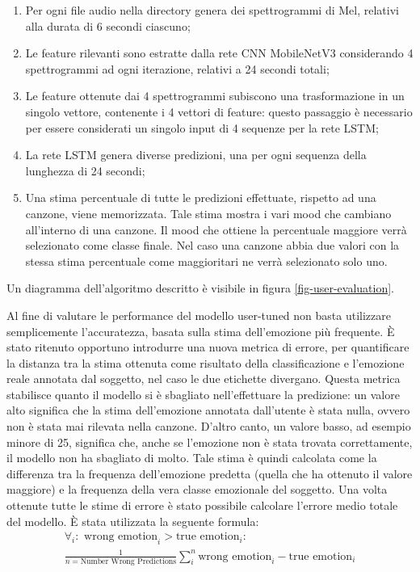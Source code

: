 \documentclass[11pt]{report}
\begin{document}
\begin{enumerate}
    \item Per ogni file audio nella directory genera dei spettrogrammi di Mel, relativi alla durata di 6 secondi ciascuno;
    
    \item Le feature rilevanti sono estratte dalla rete CNN MobileNetV3 considerando 4 spettrogrammi ad ogni iterazione, relativi a 24 secondi totali;
    
    \item Le feature ottenute dai 4 spettrogrammi subiscono una trasformazione in un singolo vettore, contenente i 4 vettori di feature: questo passaggio è necessario per essere considerati un singolo input di 4 sequenze per la rete LSTM;
    
    \item  La rete LSTM genera diverse predizioni, una per ogni sequenza della lunghezza di 24 secondi;
    
    \item Una stima percentuale di tutte le predizioni effettuate, rispetto ad una canzone, viene memorizzata. Tale stima mostra i vari mood che cambiano all'interno di una canzone. Il mood che ottiene la percentuale maggiore verrà selezionato come classe finale. Nel caso una canzone abbia due valori con la stessa stima percentuale come maggioritari ne verrà selezionato solo uno.
    
    
\end{enumerate}

Un diagramma dell'algoritmo descritto è visibile in figura \ref{fig-user-evaluation}.


\newpage

Al fine di valutare le performance del modello user-tuned non basta utilizzare semplicemente l'accuratezza, basata sulla stima dell'emozione più frequente. È stato ritenuto opportuno introdurre una nuova metrica di errore, per quantificare la distanza tra la stima ottenuta come risultato della classificazione e l'emozione reale annotata dal soggetto, nel caso le due etichette divergano. Questa metrica stabilisce quanto il modello si è sbagliato nell'effettuare la predizione: un valore alto significa che la stima dell'emozione annotata dall'utente è stata nulla, ovvero non è stata mai rilevata nella canzone. D'altro canto, un valore basso, ad esempio minore di 25, significa che, anche se l'emozione non è stata trovata correttamente, il modello non ha sbagliato di molto. Tale stima è quindi calcolata come la differenza tra la frequenza dell'emozione predetta (quella che ha ottenuto il valore maggiore) e la frequenza della vera classe emozionale del soggetto. Una volta ottenute tutte le stime di errore è stato possibile calcolare l'errore medio totale del modello. È stata utilizzata la seguente formula:
\begin{equation}
\begin{multlined}
\forall_i: \text{ wrong emotion}_i > \text{true emotion}_i: \\
\frac{1}{n  = \text{Number Wrong Predictions}} \sum_{i}^n \text{wrong emotion}_i - \text{true emotion}_i
\end{multlined}
\end{equation}
\end{document}
